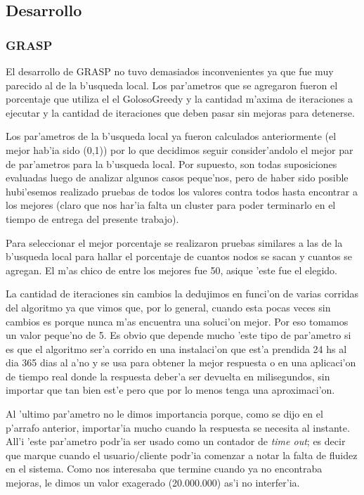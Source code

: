 \subsection{Desarrollo}
\subsubsection{GRASP}
El desarrollo de GRASP no tuvo demasiados inconvenientes ya que fue muy parecido al de la b'usqueda local. Los par'ametros que se agregaron fueron el porcentaje que utiliza el el GolosoGreedy y la cantidad m'axima de iteraciones a ejecutar y la cantidad de iteraciones que deben pasar sin mejoras para detenerse. 

Los par'ametros de la b'usqueda local ya fueron calculados anteriormente (el mejor hab'ia sido (0,1)) por lo que decidimos seguir consider'andolo el mejor par de par'ametros para la b'usqueda local. Por supuesto, son todas suposiciones evaluadas luego de analizar algunos casos peque'nos, pero de haber sido posible hubi'esemos realizado pruebas de todos los valores contra todos hasta encontrar a los mejores (claro que nos har'ia falta un cluster para poder terminarlo en el tiempo de entrega del presente trabajo). 

Para seleccionar el mejor porcentaje se realizaron pruebas similares a las de la b'usqueda local para hallar el porcentaje de cuantos nodos se sacan y cuantos se agregan. El m'as chico de entre los mejores fue 50, asique 'este fue el elegido.

La cantidad de iteraciones sin cambios la dedujimos en funci'on de varias corridas del algoritmo ya que vimos que, por lo general, cuando esta pocas veces sin cambios es porque nunca m'as encuentra una soluci'on mejor. Por eso tomamos un valor peque'no de 5. Es obvio que depende mucho 'este tipo de par'ametro si es que el algoritmo ser'a corrido en una instalaci'on que est'a prendida 24 hs al dia 365 dias al a'no y se usa para obtener la mejor respuesta o en una aplicaci'on de tiempo real donde la respuesta deber'a ser devuelta en milisegundos, sin importar que tan bien est'e pero que por lo menos tenga una aproximaci'on.

Al 'ultimo par'ametro no le dimos importancia porque, como se dijo en el p'arrafo anterior, importar'ia mucho cuando la respuesta se necesita al instante. All'i 'este par'ametro podr'ia ser usado como un contador de \emph{time out}; es decir que marque cuando el usuario/cliente podr'ia comenzar a notar la falta de fluidez en el sistema. Como nos interesaba que termine cuando ya no encontraba mejoras, le dimos un valor exagerado (20.000.000) as'i no interfer'ia.


